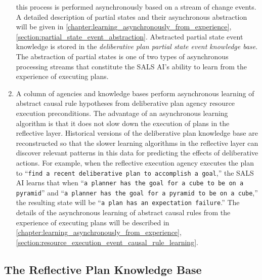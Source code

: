\begin{enumerate}[~~A.]
  this process is performed asynchronously based on a stream of change
  events.  A detailed description of partial states and their
  asynchronous abstraction will be given in
  {\mbox{\autoref{chapter:learning_asynchronously_from_experience}}},
  {\mbox{\autoref{section:partial_state_event_abstraction}}}.
  Abstracted partial state event knowledge is stored in the
  {\emph{deliberative plan partial state event knowledge base}}.  The
  abstraction of partial states is one of two types of asynchronous
  processing streams that constitute the SALS AI's ability to learn
  from the experience of executing plans.
\item A column of agencies and knowledge bases perform asynchronous
  learning of abstract causal rule hypotheses from deliberative plan
  agency resource execution preconditions.  The advantage of an
  asynchronous learning algorithm is that it does not slow down the
  execution of plans in the reflective layer.  Historical versions of
  the deliberative plan knowledge base are reconstructed so that the
  slower learning algorithms in the reflective layer can discover
  relevant patterns in this data for predicting the effects of
  deliberative actions.  For example, when the reflective execution
  agency executes the plan to ``{\tt{find a recent deliberative plan
      to accomplish a goal}},'' the SALS AI learns that when ``{\tt{a
      planner has the goal for a cube to be on a pyramid}}'' and
  ``{\tt{a planner has the goal for a pyramid to be on a cube}},'' the
  resulting state will be ``{\tt{a plan has an expectation
      failure}}.''  The details of the asynchronous learning of
  abstract causal rules from the experience of executing plans will be
  described in
  {\mbox{\autoref{chapter:learning_asynchronously_from_experience}}},
  {\mbox{\autoref{section:resource_execution_event_causal_rule_learning}}}.
\end{enumerate}

\subsection{The Reflective Plan Knowledge Base}
\label{section:the_reflective_plan_knowledge_base}

